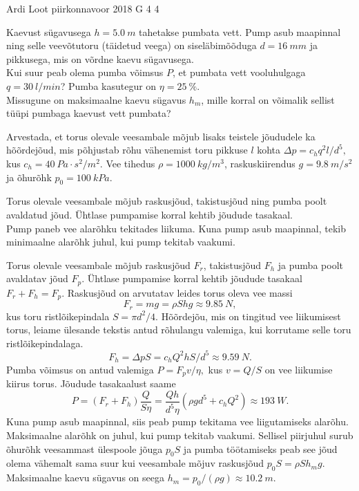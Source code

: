{Ardi Loot} %
{piirkonnavoor} %
{2018} %
{G 4} %
{4} %
{
\ifStatement
Kaevust sügavusega $h=\SI{5.0}{m}$ tahetakse pumbata vett. Pump asub
maapinnal ning selle veevõtutoru (täidetud veega) on siseläbimõõduga
$d=\SI{16}{mm}$ ja pikkusega, mis on võrdne kaevu sügavusega.\\
\osa Kui suur peab olema pumba võimsus $P$, et pumbata vett vooluhulgaga
$q=\SI{30}{l/min}$? Pumba kasutegur on $\eta=\SI{25}{\percent}$.\\
\osa Missugune on maksimaalne kaevu sügavus $h_{m}$, mille korral on
võimalik sellist tüüpi pumbaga kaevust vett pumbata?

Arvestada, et torus olevale veesambale mõjub lisaks teistele jõududele
ka hõõrdejõud, mis põhjustab rõhu vähenemist toru pikkuse $l$ kohta $\Delta p=c_{h}q^{2}l/d^{5},$
kus $c_{h}=\SI{40}{Pa\cdot s^{2}/m^{2}}.$ Vee tihedus $\rho=\SI{1000}{kg/m^{3}}$,
raskuskiirendus $g=\SI{9.8}{m/s^{2}}$ ja õhurõhk $p_{0}=\SI{100}{kPa}.$
\fi


\ifHint
\osa Torus olevale veesambale mõjub raskusjõud, takistusjõud ning pumba poolt avaldatud jõud. Ühtlase pumpamise korral kehtib jõudude tasakaal.\\
\osa Pump paneb vee alarõhku tekitades liikuma. Kuna pump asub maapinnal, tekib minimaalne alarõhk juhul, kui pump tekitab vaakumi.
\fi


\ifSolution
\osa Torus olevale veesambale mõjub raskusjõud $F_{r}$, takistusjõud $F_{h}$
ja pumba poolt avaldatav jõud $F_{p}$. Ühtlase pumpamise korral
kehtib jõudude tasakaal $F_{r}+F_{h}=F_{p}$. Raskusjõud on
arvutatav leides torus oleva vee massi
\[
F_{r}=mg=\rho Shg\approx\SI{9.85}{N},
\]
kus toru ristlõikepindala $S=\pi d^{2}/4.$ Hõõrdejõu, mis
on tingitud vee liikumisest torus, leiame ülesande tekstis antud rõhulangu
valemiga, kui korrutame selle toru ristlõikepindalaga.
\[
F_{h}=\Delta pS=c_{h}Q^{2}hS/d^{5}\approx\SI{9.59}{N}.
\]
Pumba võimsus on antud valemiga $P=F_{p}v/\eta,$ kus $v=Q/S$
on vee liikumise kiirus torus. Jõudude tasakaalust saame
\[
P=\left(F_{r}+F_{h}\right)\frac{Q}{S\eta}=\frac{Qh}{d^{5}\eta}\left(\rho gd^{5}+c_{h}Q^{2}\right)\approx\SI{193}{W}.
\]
\osa Kuna pump asub maapinnal, siis peab pump tekitama vee liigutamiseks
alarõhu. Maksimaalne alarõhk on juhul, kui pump tekitab vaakumi.
Sellisel piirjuhul surub õhurõhk veesammast ülespoole jõuga $p_{0}S$
ja pumba töötamiseks peab see jõud olema vähemalt sama suur kui veesambale
mõjuv raskusjõud $p_{0}S=\rho Sh_{m}g.$ Maksimaalne kaevu sügavus
on seega $h_{m}=p_{0}/\left(\rho g\right)\approx\SI{10.2}{m}$.
\fi


}
